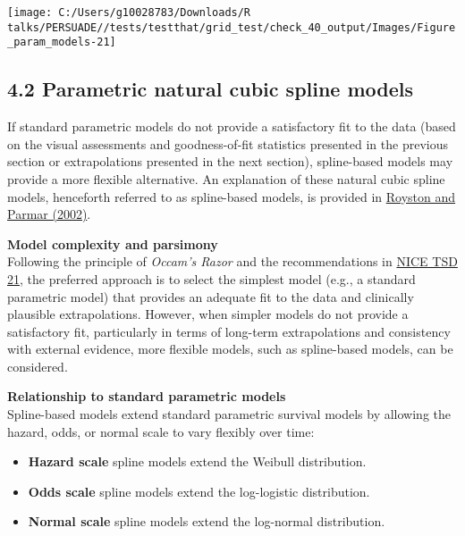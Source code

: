 \documentclass[
]{article}
\providecommand{\tightlist}{%
  \setlength{\itemsep}{0pt}\setlength{\parskip}{0pt}}
\begin{document}
\begin{flushleft}\texttt{[image: C:/Users/g10028783/Downloads/R talks/PERSUADE//tests/testthat/grid\_test/check\_40\_output/Images/Figure\_param\_models-21]} \end{flushleft}

\clearpage

\subsection{4.2 Parametric natural cubic spline
models}\label{parametric-natural-cubic-spline-models}

If standard parametric models do not provide a satisfactory fit to the
data (based on the visual assessments and goodness-of-fit statistics
presented in the previous section or extrapolations presented in the
next section), spline-based models may provide a more flexible
alternative. An explanation of these natural cubic spline models,
henceforth referred to as spline-based models, is provided in
\href{https://doi.org/10.1002/sim.1203}{Royston and Parmar (2002)}.

\textbf{Model complexity and parsimony}\\
Following the principle of \emph{Occam's Razor} and the recommendations
in
\href{https://www.sheffield.ac.uk/media/34188/download?attachment}{NICE
TSD 21}, the preferred approach is to select the simplest model (e.g., a
standard parametric model) that provides an adequate fit to the data and
clinically plausible extrapolations. However, when simpler models do not
provide a satisfactory fit, particularly in terms of long-term
extrapolations and consistency with external evidence, more flexible
models, such as spline-based models, can be considered.

\textbf{Relationship to standard parametric models}\\
Spline-based models extend standard parametric survival models by
allowing the hazard, odds, or normal scale to vary flexibly over time:

\begin{itemize}
\tightlist
\item
  \textbf{Hazard scale} spline models extend the Weibull distribution.\\
\item
  \textbf{Odds scale} spline models extend the log-logistic
  distribution.\\
\item
  \textbf{Normal scale} spline models extend the log-normal
  distribution.
\end{itemize}
\end{document}
